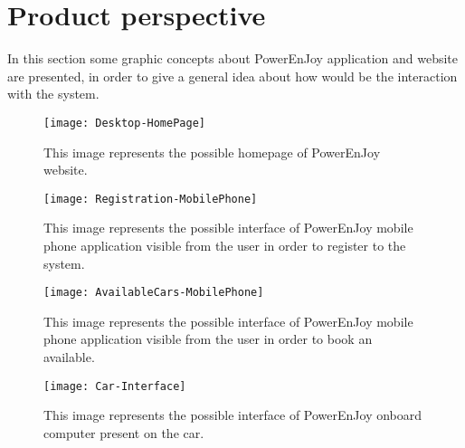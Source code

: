 \section{Product perspective}
In this section some graphic concepts about PowerEnJoy application and website are presented, in order to give a general idea about how would be the interaction with the system. 


\begin{figure}[H]
	\centering
	\texttt{[image: Desktop-HomePage]}
	\caption[Car state diagram]{This image represents the possible homepage of PowerEnJoy website.}
	\label{fig:Desktop-HomePage}
\end{figure}

\begin{figure}[H]
	\centering
	\texttt{[image: Registration-MobilePhone]}
	\caption[Car state diagram]{This image represents the possible interface of PowerEnJoy mobile phone application visible from the user in order to register to the system.}
	\label{fig:Registration-MobilePhone}
\end{figure}

\begin{figure}[H]
	\centering
	\texttt{[image: AvailableCars-MobilePhone]}
	\caption[Car state diagram]{This image represents the possible interface of PowerEnJoy mobile phone application visible from the user in order to book an available.}
	\label{fig:AvailableCars-MobilePhone}
\end{figure}

\begin{figure}[H]
	\centering
	\texttt{[image: Car-Interface]}
	\caption[Car state diagram]{This image represents the possible interface of PowerEnJoy onboard computer present on the car.}
	\label{fig:Car-Interface}
\end{figure}